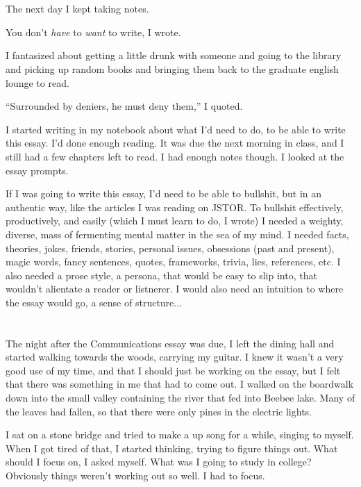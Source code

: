 \section{}

The next day I kept taking notes.

You don't \textit{have} to \textit{want} to write, I wrote.

I fantasized about getting a little drunk with someone and going to the library
and picking up random books and bringing them back to the graduate english
lounge to read.  

``Surrounded by deniers, he must deny them,'' I quoted.

I started writing in my notebook about what I'd need to do, to be able to write
this essay.  I'd done enough reading.  It was due the next morning in class, and
I still had a few chapters left to read.  I had enough notes though.  I looked
at the essay prompts.

If I was going to write this essay, I'd need to be able to bullshit, but in an
authentic way, like the articles I was reading on JSTOR.  To bullshit
effectively, productively, and easily (which I must learn to do, I wrote) I
needed a weighty, diverse, mass of fermenting mental matter in the sea of my
mind.  I needed facts, theories, jokes, friends, stories, personal issues,
obsessions (past and present), magic words, fancy sentences, quotes,
frameworks, trivia, lies, references, etc.  I also needed a prose style, a
persona, that would be easy to slip into, that wouldn't alientate a reader or
listnerer.  I would also need an intuition to where the essay would go, a sense
of structure...

\section{}

The night after the Communications essay was due, I left the dining hall and
started walking towards the woods, carrying my guitar.  I knew it wasn't a very
good use of my time, and that I should just be working on the essay, but I felt
that there was something in me that had to come out.  I walked on the boardwalk
down into the small valley containing the river that fed into Beebee lake.  Many
of the leaves had fallen, so that there were only pines in the electric lights.

I sat on a stone bridge and tried to make a up song for a while, singing to
myself.  When I got tired of that, I started thinking, trying to figure things
out.  What should I focus on, I asked myself.  What was I going to study in
college?  Obviously things weren't working out so well.  I had to focus.


